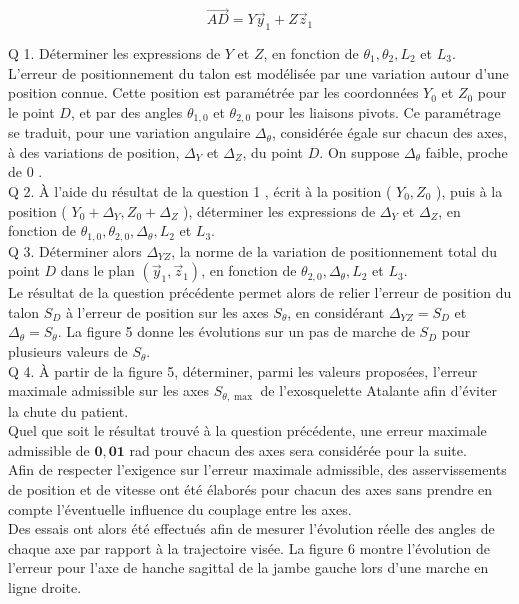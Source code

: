 \documentclass[10pt]{article}
\begin{document}
$$
\overrightarrow{A D}=Y \vec{y}_{1}+Z \vec{z}_{1}
$$

Q 1. Déterminer les expressions de $Y$ et $Z$, en fonction de $\theta_{1}, \theta_{2}, L_{2}$ et $L_{3}$.\\
L'erreur de positionnement du talon est modélisée par une variation autour d'une position connue. Cette position est paramétrée par les coordonnées $Y_{0}$ et $Z_{0}$ pour le point $D$, et par des angles $\theta_{1,0}$ et $\theta_{2,0}$ pour les liaisons pivots. Ce paramétrage se traduit, pour une variation angulaire $\Delta_{\theta}$, considérée égale sur chacun des axes, à des variations de position, $\Delta_{Y}$ et $\Delta_{Z}$, du point $D$. On suppose $\Delta_{\theta}$ faible, proche de 0 .\\
Q 2. À l'aide du résultat de la question 1 , écrit à la position ( $Y_{0}, Z_{0}$ ), puis à la position ( $Y_{0}+\Delta_{Y}, Z_{0}+\Delta_{Z}$ ), déterminer les expressions de $\Delta_{Y}$ et $\Delta_{Z}$, en fonction de $\theta_{1,0}, \theta_{2,0}, \Delta_{\theta}, L_{2}$ et $L_{3}$.\\
Q 3. Déterminer alors $\Delta_{Y Z}$, la norme de la variation de positionnement total du point $D$ dans le plan $\left(\vec{y}_{1}, \vec{z}_{1}\right)$, en fonction de $\theta_{2,0}, \Delta_{\theta}, L_{2}$ et $L_{3}$.\\
Le résultat de la question précédente permet alors de relier l'erreur de position du talon $S_{D}$ à l'erreur de position sur les axes $S_{\theta}$, en considérant $\Delta_{Y Z}=S_{D}$ et $\Delta_{\theta}=S_{\theta}$. La figure 5 donne les évolutions sur un pas de marche de $S_{D}$ pour plusieurs valeurs de $S_{\theta}$.\\
Q 4. À partir de la figure 5, déterminer, parmi les valeurs proposées, l'erreur maximale admissible sur les axes $S_{\theta, \max }$ de l'exosquelette Atalante afin d'éviter la chute du patient.\\
Quel que soit le résultat trouvé à la question précédente, une erreur maximale admissible de $\mathbf{0 , 0 1}$ rad pour chacun des axes sera considérée pour la suite.\\
Afin de respecter l'exigence sur l'erreur maximale admissible, des asservissements de position et de vitesse ont été élaborés pour chacun des axes sans prendre en compte l'éventuelle influence du couplage entre les axes.\\
Des essais ont alors été effectués afin de mesurer l'évolution réelle des angles de chaque axe par rapport à la trajectoire visée. La figure 6 montre l'évolution de l'erreur pour l'axe de hanche sagittal de la jambe gauche lors d'une marche en ligne droite.\\
\end{document}
